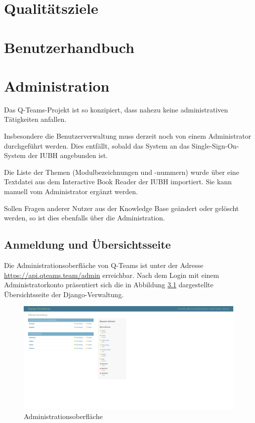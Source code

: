 \documentclass[a4paper,11pt,listof=numbered,glossary=totoc,parskip=half,toc=bib]{scrreprt}
\begin{document}
\begin{appendices}
		
			
		
		
		
	
	\chapter{Qualitätsziele}
	\chapter{Benutzerhandbuch}

	\chapter{Administration}
	Das Q-Teams-Projekt ist so konzipiert, dass nahezu keine administrativen Tätigkeiten anfallen.
	
	Insbesondere die Benutzerverwaltung muss derzeit noch von einem Administrator durchgeführt werden. Dies entfällt, sobald das System an das Single-Sign-On-System der IUBH angebunden ist.
	
	Die Liste der Themen (Modulbezeichnungen und -nummern) wurde über eine Textdatei aus dem Interactive Book Reader der IUBH importiert. Sie kann manuell vom Administrator ergänzt werden.

	Sollen Fragen anderer Nutzer aus der Knowledge Base geändert oder gelöscht werden, so ist dies ebenfalls über die Administration. 	
		
	\section{Anmeldung und Übersichtsseite}
	Die Administrationsoberfläche von Q-Teams ist unter der Adresse  \url{https://api.qteams.team/admin}	erreichbar. Nach dem Login mit einem Administratorkonto präsentiert sich die in Abbildung \ref{fig:admin} dargestellte Übersichtsseite der Django-Verwaltung.
	
	\begin{figure}[h!]
		\centering
		\includegraphics[width=\textwidth]{admin}
		\caption{Administrationsoberfläche}
		\label{fig:admin}
	\end{figure}
	

\end{appendices}
\end{document}
